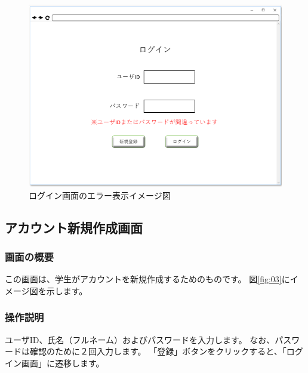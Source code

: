 \begin{figure}[phtbp]
  \begin{center}
    \includegraphics[width=1\linewidth,clip]{./img/02.png}
    \caption{ログイン画面のエラー表示イメージ図}\label{fig:02}
  \end{center}
\end{figure}

\newpage

\subsection{アカウント新規作成画面}
\subsubsection{画面の概要}
この画面は、学生がアカウントを新規作成するためのものです。
図\ref{fig:03}にイメージ図を示します。

\subsubsection{操作説明}
ユーザID、氏名（フルネーム）およびパスワードを入力します。
なお、パスワードは確認のために２回入力します。
「登録」ボタンをクリックすると、「ログイン画面」に遷移します。

